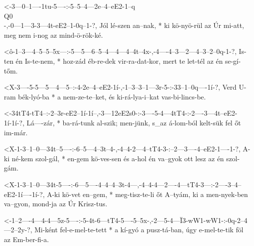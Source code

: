 
  {<-3---0--1----1tu-5----:-5--5--4---2e--4--eE2-1--q\\Q0\\-,-0---1---3-3---4t-eE2--1-0q--1-?,}
  {  Jól lé-szen an--nak, * ki kö-nyö-rül az Úr  mi-att,      meg nem i-nog az mind-ö-rök-ké.}




  {<ô-1--3---4--5--5--5x---:-5---5---6--5--4---4---4--4t--4x-,-4----4--3---2---4--3--2--0q-1-?,}
  {   Is-ten én Is-te-nem, * hoz-zád éb-re-dek vir-ra-dat-kor, mert te let-tél az én se-gí-tőm.}

  {<X-3----5-5---5---4---5--:-4-2e--4--eE2-1í-,-1--3--3--1---3r-5-:-33--1--0q----1í-?,}
  {   Verd U-ram bék-lyó-ba * a nem-ze-te--ket, és ki-rá-lya-i--kat vas-bi-lincs-be.}


  {<-34tT4-tT4--:-2--3r-eE2--1í-1í--,-3---12eE2s0-:-3----5-4---4tT4-:-2----3---4t--eE2-1í-1í-?,}
  {  Lá----zár, * ba-rá-tunk al-szik; men-jünk,     s_az á-lom-ból    kelt-sük fel őt  im-már.}

  {<X-1-3--1--0---34t--5----:-6--5---4--3t--4-,-4--4-2---4--tT4-3-:--2---3----4--eE2-1----1-?,}
  {   A-ki né-kem szol-gál, * en-gem kö-ves-sen és a-hol én va--gyok ott lesz az én  szol-gám.}

  {<X-1-3--1--0---34t-5----:-6---5----4--4--4--3t-4---,-4--4-4---2----4---tT4-3---:-2----3--4--eE2-1í----1í-?,}
  {   A-ki kö-vet en--gem, * meg-tisz-te-li őt A--tyám, ki a men-nyek-ben va--gyon, mond-ja az Úr  Krisz-tus.}


  {<-1--2----4---4-4---5z-5----:-5-4t-6---tT4-5----5--5x-,-2---5-4---Ï3-wW1-wW1-:-0q-2--4---2--2y-?,}
  {  Mi-ként fel-e-mel-te-tett * a kí-gyó a   pusz-tá-ban, úgy e-mel-te-tik föl   az Em-ber-fi-a.}

